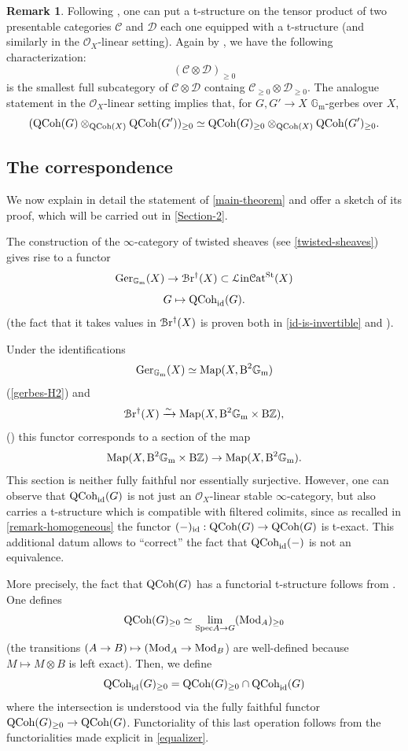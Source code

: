 \documentclass[11pt, twoside]{article} %
\numberwithin{equation}{section}
\theoremstyle{plain}
\theoremstyle{definition}
\newtheorem{rem}[thm]{Remark}
\newcommand{\B}{\textup{B}}
\newcommand{\Z}{\mathbb Z}
\newcommand{\Map}{\textup{Map}}
\newcommand{\cc}{\mathcal C}
\newcommand{\cD}{\mathcal D}
\newcommand{\Gm}{\mathbb G_{\mathrm{m}}}
\newcommand{\id}{\textup{id}}
\newcommand{\QCoh}{\textup{QCoh}}
\newcommand{\cO}{{\mathcal O}}
\newcommand{\cBre}{\mathcal{B}\textup{r}^\dagger}
\newcommand{\Ger}{\textup{Ger}}
\newcommand{\Mod}{\textup{Mod}}
\newcommand{\Lin}{\mathcal L\textup{in}\mathcal{C}\textup{at}^{\textup{St}}}
\newcommand{\Spec}{\textup{Spec}}
\begin{document}
 		

 \begin{rem}\label{t-structure-tensor}
     Following \cite[Remark C.4.2.2]{SAG}, one can put a t-structure on the tensor product of two presentable categories $\cc$ and $\cD$ each one equipped with a t-structure (and similarly in the $\cO_X$-linear setting). Again by \cite[Remark C.4.2.2]{SAG}, we have the following characterization: $$(\cc\otimes\cD)_{\geq 0}$$ is the smallest full subcategory of $\cc\otimes \cD$ containg $\cc_{\geq 0}\otimes \cD_{\geq 0}$. The analogue statement in the $\cO_X$-linear setting implies that, for $G,G'\to X$ $\Gm$-gerbes over $X$, $$(\QCoh(G)\otimes_{\QCoh(X)}\QCoh(G'))_{\geq 0}\simeq \QCoh(G)_{\geq 0}\otimes_{\QCoh(X)}\QCoh(G')_{\geq 0}.$$
 \end{rem}
 
 


 \subsection{The correspondence}\label{outline}
    We now explain in detail the statement of \cref{main-theorem} and offer a sketch of its proof, which will be carried out in \cref{Section-2}.
    
  The construction of the $\infty$-category of twisted sheaves (see \cref{twisted-sheaves}) gives rise to a functor $$\Ger_{\Gm}(X)\to \cBre(X)\subset \Lin(X)$$
	$$G\mapsto \QCoh_{\id}(G).$$ (the fact that it takes values in $\cBre(X)$ is proven both in \cref{id-is-invertible} and \cite[Example 9.3]{Hall-Rydh}).
 
	Under the identifications $$\Ger_{\Gm}(X)\simeq\Map(X,\B^2\Gm)$$ (\cref{gerbes-H2}) and $$\cBre(X)\xrightarrow{\sim} \Map(X, \B^2\Gm\times \B\Z),$$
 (\cite[Example 11.5.5.5]{SAG}) this functor corresponds to a section of the map $$\Map(X, \B^2\Gm\times \B\Z)\to \Map(X,\B^2\Gm).$$ This section is neither fully faithful nor essentially surjective. However, one can observe that $\QCoh_\id(G)$ is not just an $\cO_X$-linear stable $\infty$-category, but also carries a t-structure which is compatible with filtered colimits, since as recalled in \cref{remark-homogeneous} the functor $(-)_\id:\QCoh(G)\to \QCoh(G)$ is t-exact. This additional datum allows to ``correct'' the fact that $\QCoh_\id(-)$ is not an equivalence. 
 
 More precisely, the fact that $\QCoh(G)$ has a functorial t-structure follows from \cite[Example 10.1.6.2, 10.1.7.2]{SAG}. One defines $$\QCoh(G)_{\geq 0}\simeq \lim_{\Spec A\to G}(\Mod_A)_{\geq 0}$$ (the transitions $(A\to B)\mapsto (\Mod_A\to \Mod_B$) are well-defined because $M\mapsto M\otimes B$ is left exact). Then, we define $$\QCoh_\id(G)_{\geq 0}=\QCoh(G)_{\geq 0}\cap \QCoh_\id(G)$$ where the intersection is understood via the fully faithful functor $\QCoh(G)_{\geq 0}\to \QCoh(G)$. Functoriality of this last operation follows from the functorialities made explicit in \cref{equalizer}.
 
\end{document}
